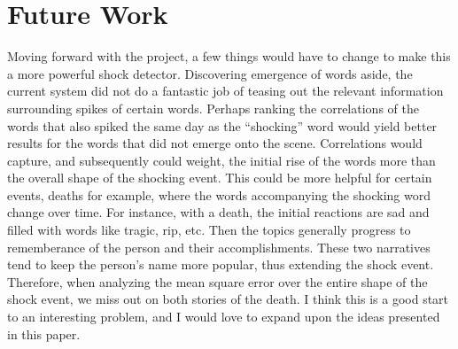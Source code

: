 \documentclass{article}
\begin{document}
\section{Future Work}

Moving forward with the project,
a few things would have to change to make this a more powerful shock detector.
Discovering emergence of words aside,
the current system did not do a fantastic job of teasing out the relevant
information surrounding spikes of certain words.
Perhaps ranking the correlations of the words that also spiked the same day
as the ``shocking'' word would yield better results for the words that did
not emerge onto the scene.
Correlations would capture,
and subsequently could weight,
the initial rise of the words more than the overall shape of the shocking event.
This could be more helpful for certain events,
deaths for example,
where the words accompanying the shocking word change over time.
For instance,
with a death,
the initial reactions are sad and filled with words like tragic, rip, etc.
Then the topics generally progress to rememberance of the person and their
accomplishments.
These two narratives tend to keep the person's name more popular,
thus extending the shock event.
Therefore,
when analyzing the mean square error over the entire shape of the shock event,
we miss out on both stories of the death.
I think this is a good start to an interesting problem, 
and I would love to expand upon the ideas presented in this paper.
\end{document}
